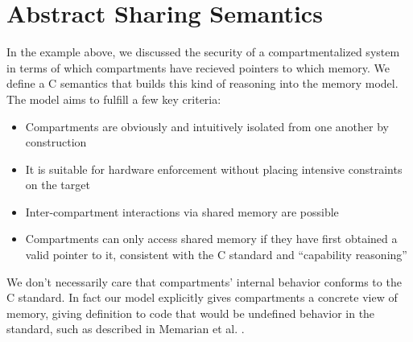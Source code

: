 \documentclass{article}
\begin{document}
\section{Abstract Sharing Semantics}

In the example above, we discussed the security of a compartmentalized
system in terms of which compartments have recieved pointers to which memory.
We define a C semantics that builds this kind of reasoning into the memory model.
The model aims to fulfill a few key criteria:

\begin{itemize}
\item Compartments are obviously and intuitively isolated from one another
  by construction
\item It is suitable for hardware enforcement without placing intensive constraints
  on the target
\item Inter-compartment interactions via shared memory are possible
\item Compartments can only access shared memory if they have first obtained a
  valid pointer to it, consistent with the C standard and ``capability reasoning''
\end{itemize}

We don't necessarily care that compartments' internal behavior
conforms to the C standard. In fact our model explicitly gives compartments
a concrete view of memory, giving definition to code that would be undefined behavior
in the standard, such as described in Memarian et al. \cite{Memarian19:ExploringCSemantics}.
\end{document}

